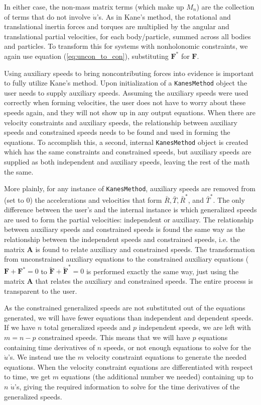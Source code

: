 \documentclass[twocolumn,10pt,final]{asme2e}
\begin{document}
In either case, the non-mass matrix terms (which make up $M_n$) are the
collection of terms that do not involve $\dot{u}$'s.
As in Kane's method, the rotational and translational inertia forces and
torques are multiplied by the angular and translational partial velocities,
for each body/particle, summed across all bodies and particles.
To transform this for systems with nonholonomic constraints, we again
use equation (\ref{eq:uncon_to_con}), substituting $\mathbf{F}^*$ for
$\mathbf{F}$.

Using auxiliary speeds to bring noncontributing forces into evidence is
important to fully utilize Kane's method.
Upon initialization of a \verb|KanesMethod| object the user needs to supply
auxiliary speeds.
Assuming the auxiliary speeds were used correctly when forming velocities, the
user does not have to worry about these speeds again, and they will not show up
in any output equations.
When there are velocity constraints and auxiliary speeds, the relationship
between auxiliary speeds and constrained speeds needs to be found and
used in forming the equations.
To accomplish this, a second, internal \verb|KanesMethod| object is created
which has the same constraints and constrained speeds, but auxiliary speeds are
supplied as both independent and auxiliary speeds, leaving the rest of the math
the same.

More plainly, for any instance of \verb|KanesMethod|, auxiliary speeds are
removed from (set to 0) the accelerations and velocities that form
$\bar{R}, \bar{T}, \bar{R}^*$, and $\bar{T}^*$.
The only difference between the user's and the internal instance is which
generalized speeds are used to form the partial velocities: independent or
auxiliary.
The relationship between auxiliary speeds and constrained speeds is found
the same way as the relationship between the independent speeds and constrained
speeds, i.e. the matrix $\mathbf{A}$ is found to relate auxiliary and
constrained speeds.
The transformation from unconstrained auxiliary equations to the
constrained auxiliary equations ($\mathbf{F} + \mathbf{F}^*=0$ to
$\tilde{\mathbf{F}} + \tilde{\mathbf{F}}^* = 0$ is performed exactly the same
way, just using the matrix $\mathbf{A}$ that relates the auxiliary and
constrained speeds.
The entire process is transparent to the user.

As the constrained generalized speeds are not substituted out of the equations
generated, we will have fewer equations than independent and dependent speeds.
If we have $n$ total generalized speeds and $p$ independent speeds, we are left
with $m=n-p$ constrained speeds.
This means that we will have $p$ equations containing time derivatives of $n$
speeds, or not enough equations to solve for the $\dot{u}$'s.
We instead use the $m$ velocity constraint equations to generate the needed
equations.
When the velocity constraint equations are differentiated with respect to time,
we get $m$ equations (the additional number we needed) containing up to $n$
$\dot{u}$'s, giving the required information to solve for the time derivatives
of the generalized speeds.
\end{document}
